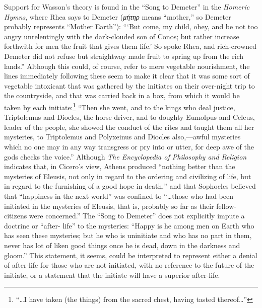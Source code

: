 Support for Wasson's theory is found in the \enquote{Song to
Demeter} in the \emph{Homeric Hymns},\supercite{hesiod:homeric-hymns}
where Rhea says to Demeter (\emph{μήτηρ} means \enquote{mother,} so Demeter probably represents
\enquote{Mother Earth}): \enquote{\enquote*{But come, my child, obey, and be not
too angry unrelentingly with the dark-clouded son of Conos;
but rather increase forthwith for men the fruit that gives
them life.} So spoke Rhea, and rich-crowned Demeter did
not refuse but straightway made fruit to spring up from the
rich lands.} Although this could, of course, refer to mere
vegetable nourishment, the lines immediately following these
seem to make it clear that it was some sort of vegetable
intoxicant that was gathered by the initiates on their over-night
trip to the countryside, and that was carried back in
a box, from which it would be taken by each initiate:\footnote{\enquote{\dots I have taken (the things) from the sacred chest, having tasted thereof\dots}\supercite{britannica:encyclopedia}}
\enquote{Then she went, and to the kings who deal justice, Triptolemus
and Diocles, the horse-driver, and to doughty Eumolpus and
Celeus, leader of the people, she showed the conduct of the
rites and taught them all her mysteries, to Triptolemus and
Polyxeinus and Diocles also,---awful mysteries which no
one may in any way transgress or pry into or utter, for
deep awe of the gods checks the voice.}\supercite{hesiod:homeric-hymns}
Although \emph{The Encyclopedia of Philosophy and Religion} indicates that, in
Cicero's view, Athens produced \enquote{nothing better than the
mysteries of Eleusis, not only in regard to the ordering and
civilizing of life, but in regard to the furnishing of a good
hope in death,} and that Sophocles believed that \enquote{happiness
in the next world} was confined to \enquote{\dots those who had been
initiated in the mysteries of Eleusis, that is, probably
so far as their fellow-citizens were concerned.}\supercite{hastings:philosophy-religion}
The \enquote{Song to Demeter} does not explicitly impute a doctrine or \enquote{after-
life} to the mysteries: \enquote{Happy is he among men on Earth who
has seen these mysteries; but he who is uninitiate and who
has no part in them, never has lot of liken good things once
he is dead, down in the darkness and gloom.}\supercite{hesiod:homeric-hymns}
This statement, it seems, could be interpreted to represent either a denial
of after-life for those who are not initiated, with no
reference to the future of the initiate, or a statement that
the initiate will have a superior after-life.

